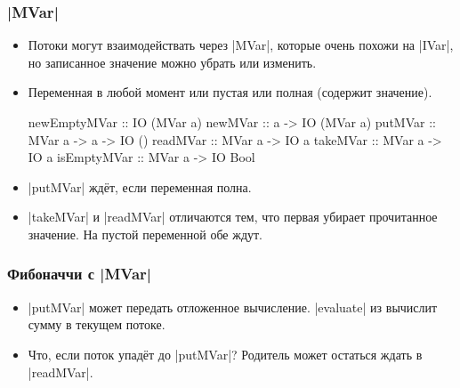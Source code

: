 \documentclass[11pt]{beamer}
\begin{document}
\begin{frame}[fragile]
  \frametitle{\haskinline|MVar|}
  \begin{itemize}
    \item Потоки могут взаимодействать через \haskinline|MVar|, которые очень похожи на \haskinline|IVar|, но записанное значение можно убрать или изменить.
    \item Переменная в любой момент или пустая или полная (содержит значение).
          \begin{haskellsmall}
            newEmptyMVar :: IO (MVar a)
            newMVar :: a -> IO (MVar a)
            putMVar :: MVar a -> a -> IO ()
            readMVar :: MVar a -> IO a
            takeMVar :: MVar a -> IO a
            isEmptyMVar :: MVar a -> IO Bool
          \end{haskellsmall}
    \item \haskinline|putMVar| ждёт, если переменная полна.
    \item \haskinline|takeMVar| и \haskinline|readMVar| отличаются тем, что первая убирает прочитанное значение. На пустой переменной обе ждут.
  \end{itemize}
\end{frame}

\begin{frame}[fragile]
  \frametitle{Фибоначчи с \haskinline|MVar|}
  \begin{itemize}
    \item \haskinline|putMVar| может передать отложенное вычисление. \haskinline|evaluate| из \href{https://hackage.haskell.org/package/base/docs/Control-Exception.html}{} вычислит сумму в текущем потоке.
    \item Что, если поток упадёт до \haskinline|putMVar|?\pause{} Родитель может остаться ждать в \haskinline|readMVar|.
  \end{itemize}
\end{frame}
\end{document}
